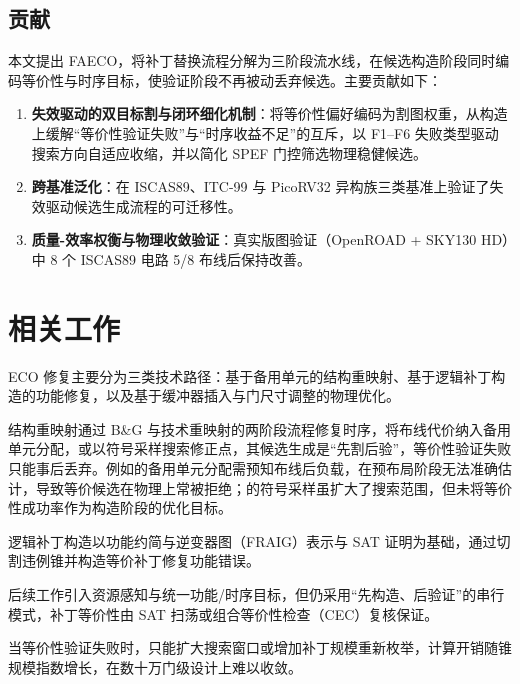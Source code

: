 \documentclass[journal]{IEEEtran}
\begin{document}
\subsection{贡献}

本文提出 FAECO，将补丁替换流程分解为三阶段流水线，在候选构造阶段同时编码等价性与时序目标，使验证阶段不再被动丢弃候选。主要贡献如下：

\begin{enumerate}
  \item \textbf{失效驱动的双目标割与闭环细化机制}：将等价性偏好编码为割图权重，从构造上缓解“等价性验证失败”与“时序收益不足”的互斥，以 F1--F6 失败类型驱动搜索方向自适应收缩，并以简化 SPEF 门控筛选物理稳健候选。
  \item \textbf{跨基准泛化}：在 ISCAS89、ITC-99 与 PicoRV32 异构族三类基准上验证了失效驱动候选生成流程的可迁移性。
  \item \textbf{质量-效率权衡与物理收敛验证}：真实版图验证（OpenROAD + SKY130 HD）中 8 个 ISCAS89 电路 5/8 布线后保持改善。
\end{enumerate}

\section{相关工作}

ECO 修复主要分为三类技术路径：基于备用单元的结构重映射、基于逻辑补丁构造的功能修复，以及基于缓冲器插入与门尺寸调整的物理优化。

结构重映射通过 B\&G 与技术重映射的两阶段流程修复时序，将布线代价纳入备用单元分配\cite{ho2010eco,ho2012treco}，或以符号采样搜索修正点\cite{kravets2019symbolic}，其候选生成是“先割后验”，等价性验证失败只能事后丢弃。例如\cite{ho2010eco}的备用单元分配需预知布线后负载，在预布局阶段无法准确估计，导致等价候选在物理上常被拒绝；\cite{kravets2019symbolic}的符号采样虽扩大了搜索范围，但未将等价性成功率作为构造阶段的优化目标。

逻辑补丁构造以功能约简与逆变器图（FRAIG）表示与 SAT 证明为基础，通过切割违例锥并构造等价补丁修复功能错误\cite{jiang2010fraig,jiang2016resource}。

后续工作引入资源感知\cite{jiang2016resource}与统一功能/时序目标\cite{lin2011simult,luo2016unified}，但仍采用“先构造、后验证”的串行模式，补丁等价性由 SAT 扫荡或组合等价性检查（CEC）复核保证\cite{mishchenko2006sat,zhong2024stp}。

当等价性验证失败时，只能扩大搜索窗口或增加补丁规模重新枚举\cite{zhuo2018patch}，计算开销随锥规模指数增长，在数十万门级设计上难以收敛。
\end{document}
